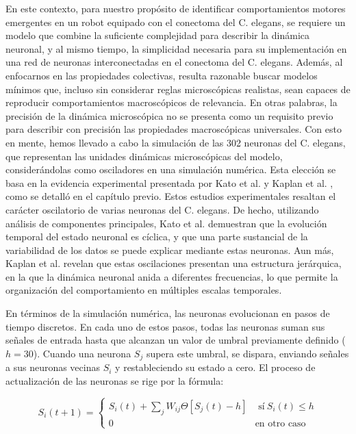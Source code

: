 En este contexto, para nuestro propósito de identificar comportamientos motores emergentes en un robot equipado con el conectoma del C. elegans, se requiere un modelo que combine la suficiente complejidad para describir la dinámica neuronal, y al mismo tiempo, la simplicidad necesaria para su implementación en una red de neuronas interconectadas en el conectoma del C. elegans. Además, al enfocarnos en las propiedades colectivas, resulta razonable buscar modelos mínimos que, incluso sin considerar reglas microscópicas realistas, sean capaces de reproducir comportamientos macroscópicos de relevancia. En otras palabras, la precisión de la dinámica microscópica no se presenta como un requisito previo para describir con precisión las propiedades macroscópicas universales. Con esto en mente, hemos llevado a cabo la simulación de las 302 neuronas del C. elegans, que representan las unidades dinámicas microscópicas del modelo, considerándolas como osciladores en una simulación numérica.  Esta elección se basa en la evidencia experimental presentada por Kato et al. \cite{kato_global_2015} y Kaplan et al. \cite{kato_global_2015}, como se detalló en el capítulo previo. Estos estudios experimentales resaltan el carácter oscilatorio de varias neuronas del C. elegans. De hecho, utilizando análisis de componentes principales, Kato et al. \cite{kato_global_2015} demuestran que la evolución temporal del estado neuronal es cíclica, y que una parte sustancial de la variabilidad de los datos se puede explicar mediante estas neuronas. Aun más, Kaplan et al. \cite{kaplan_nested_2020} revelan que estas oscilaciones presentan una estructura jerárquica, en la que la dinámica neuronal anida a diferentes frecuencias, lo que permite la organización del comportamiento en múltiples escalas temporales.


En términos de la simulación numérica, las neuronas evolucionan en pasos de tiempo discretos. En cada uno de estos pasos, todas las neuronas suman sus señales de entrada hasta que alcanzan un valor de umbral previamente definido ($h = 30$). Cuando una neurona $S_j$ supera este umbral, se dispara, enviando señales a sus neuronas vecinas $S_i$ y restableciendo su estado a cero. El proceso de actualización de las neuronas se rige por la fórmula:


\begin{equation}\label{eq:99}
	S_i(t+1)=\begin{cases}
		S_i(t)+\sum_{j} W_{ij}\Theta\left[S_j(t)-h\right]  &  \text{ sí} \ S_i(t)\leq h  \\
		0 &  \text{en otro caso}
	\end{cases}
\end{equation}



